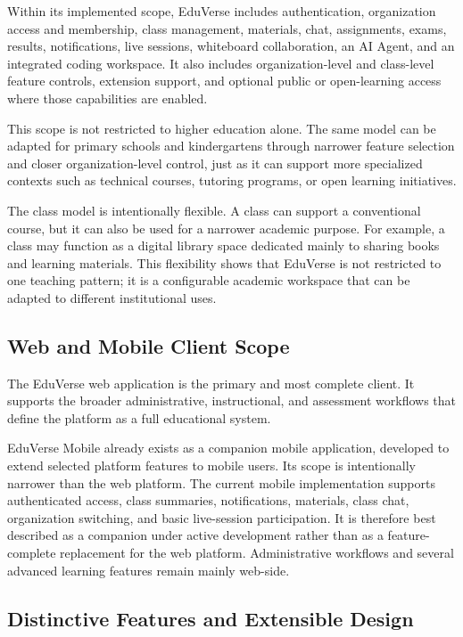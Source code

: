 Within its implemented scope, EduVerse includes authentication, organization
access and membership, class management, materials, chat, assignments, exams,
results, notifications, live sessions, whiteboard collaboration, an AI Agent,
and an integrated coding workspace. It also includes organization-level and
class-level feature controls, extension support, and optional public or
open-learning access where those capabilities are enabled.

This scope is not restricted to higher education alone. The same model can be
adapted for primary schools and kindergartens through narrower feature
selection and closer organization-level control, just as it can support more
specialized contexts such as technical courses, tutoring programs, or open
learning initiatives.

The class model is intentionally flexible. A class can support a conventional
course, but it can also be used for a narrower academic purpose. For example, a
class may function as a digital library space dedicated mainly to sharing books
and learning materials. This flexibility shows that EduVerse is not restricted
to one teaching pattern; it is a configurable academic workspace that can be
adapted to different institutional uses.

\subsection{Web and Mobile Client Scope}\label{subsec:web_mobile_client_scope}

The EduVerse web application is the primary and most complete client. It
supports the broader administrative, instructional, and assessment workflows
that define the platform as a full educational system.

EduVerse Mobile already exists as a companion mobile application, developed to
extend selected platform features to mobile users. Its scope is intentionally
narrower than the web platform. The current mobile implementation supports
authenticated access, class summaries, notifications, materials, class chat,
organization switching, and basic live-session participation. It is therefore
best described as a companion under active development rather than as a
feature-complete replacement for the web platform. Administrative workflows and
several advanced learning features remain mainly web-side.

\subsection{Distinctive Features and Extensible Design}
\label{subsec:competitive_features_innovation}

